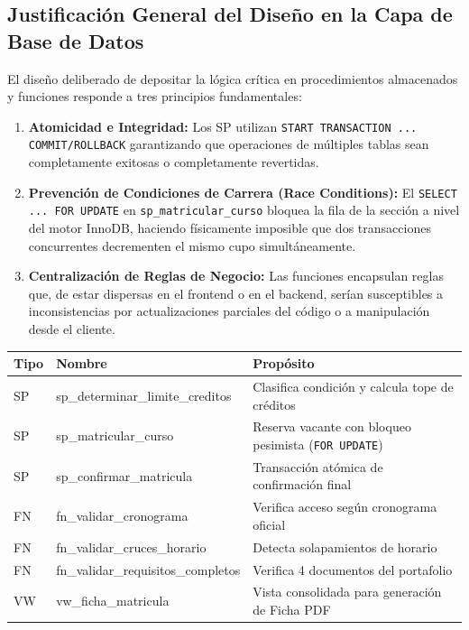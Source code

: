 \documentclass[12pt,a4paper]{article}
\begin{document}
\subsection{Justificaci\'on General del Dise\~no en la Capa de Base de Datos}

El dise\~no deliberado de depositar la l\'ogica cr\'itica en procedimientos almacenados y funciones responde a tres principios fundamentales:

\begin{enumerate}
  \item \textbf{Atomicidad e Integridad:} Los SP utilizan \texttt{START TRANSACTION ... COMMIT/ROLLBACK} garantizando que operaciones de m\'ultiples tablas sean completamente exitosas o completamente revertidas.

  \item \textbf{Prevenci\'on de Condiciones de Carrera (Race Conditions):} El \texttt{SELECT ... FOR UPDATE} en \texttt{sp\_matricular\_curso} bloquea la fila de la secci\'on a nivel del motor InnoDB, haciendo f\'isicamente imposible que dos transacciones concurrentes decrementen el mismo cupo simult\'aneamente.

  \item \textbf{Centralizaci\'on de Reglas de Negocio:} Las funciones encapsulan reglas que, de estar dispersas en el frontend o en el backend, ser\'ian susceptibles a inconsistencias por actualizaciones parciales del c\'odigo o a manipulaci\'on desde el cliente.
\end{enumerate}

\vspace{1cm}

\begin{tcolorbox}[colback=unjbgblue!5, colframe=unjbgblue,
  title=Resumen de Objetos de Base de Datos Implementados]
\small
\begin{tabularx}{\linewidth}{@{} l >{\ttfamily\footnotesize}l X @{}}
  \toprule
  \textbf{Tipo} & \normalfont\textbf{Nombre} & \textbf{Prop\'osito} \\
  \midrule
  SP & sp\_determinar\_limite\_creditos & Clasifica condici\'on y calcula tope de cr\'editos \\
  SP & sp\_matricular\_curso & Reserva vacante con bloqueo pesimista (\texttt{FOR UPDATE}) \\
  SP & sp\_confirmar\_matricula & Transacci\'on at\'omica de confirmaci\'on final \\
  \midrule
  FN & fn\_validar\_cronograma & Verifica acceso seg\'un cronograma oficial \\
  FN & fn\_validar\_cruces\_horario & Detecta solapamientos de horario \\
  FN & fn\_validar\_requisitos\_completos & Verifica 4 documentos del portafolio \\
  \midrule
  VW & vw\_ficha\_matricula & Vista consolidada para generaci\'on de Ficha PDF \\
  \bottomrule
\end{tabularx}
\end{tcolorbox}
\end{document}

